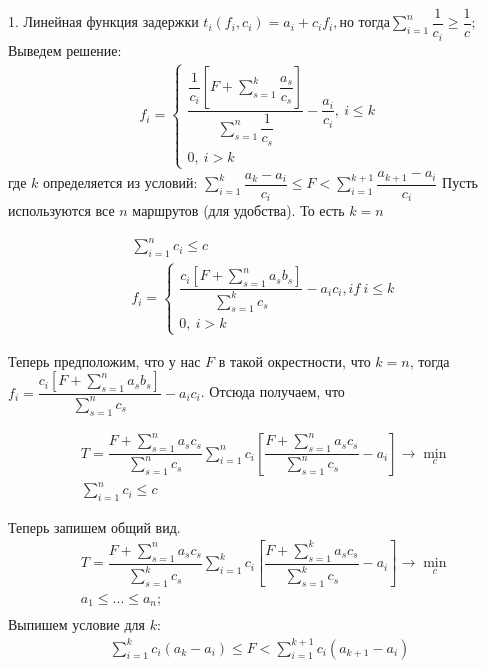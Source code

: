 \documentclass[12pt,a4paper,titlepage,oneside]{book}
\theoremstyle{definition}
\theoremstyle{plain}
\theoremstyle{remark}
\theoremstyle{remark}
\theoremstyle{plain}
\theoremstyle{plain}
\begin{document}
1. Линейная функция задержки $ t_i(f_i,c_i)=a_i+c_i f_i,\text {но тогда} \sum \limits_{i=1}^n \dfrac{1}{c_i} \geqslant \dfrac{1}{c}; $
Выведем решение:
\begin{align*}
f_i=
\begin{cases}
\dfrac{\dfrac{1}{c_i} \left [F+\sum \limits_{s=1}^k \dfrac{a_s}{c_s}\right ]}{\sum \limits_{s=1}^n  \dfrac{1}{c_s}}-\dfrac{a_i}{c_i}, \: i \leqslant k\\
0, \: i>k
\end{cases}
\end{align*}
где $k$ определяется из условий: $\sum \limits_{i=1}^k \dfrac{a_k-a_i}{c_i} \leqslant F < \sum \limits_{i=1}^{k+1} \dfrac{a_{k+1}-a_i}{c_i} $
Пусть используются все $n$ маршрутов (для удобства). То есть $k=n$

\begin{align*}
&\sum \limits_{i=1}^n c_i \leqslant c\\
&f_i=
\begin{cases}
\dfrac{c_i \left [F+\sum \limits_{s=1}^n a_s b_s \right ]}{\sum \limits_{s=1}^k c_s}-a_i c_i, if \: i \leqslant k\\
0, \: i>k
\end{cases}
\end{align*}


Теперь предположим, что у нас $ F $ в такой окрестности, что $ k = n $, тогда $ f_i=\dfrac{c_i \left [F+ \sum \limits_{s=1}^n a_s b_s\right ]}{\sum \limits_{s=1}^n c_s} -a_i c_i $. Отсюда получаем, что

\begin{align*}
&T=\dfrac{F+\sum \limits_{s=1}^n a_s c_s }{\sum \limits_{s=1}^n c_s} \sum \limits_{i=1}^n  c_i \left [ \dfrac{F+\sum \limits_{s=1}^n a_s c_s }{\sum \limits_{s=1}^n c_s} -a_i \right ] \rightarrow \min \limits_{c}\\
& \sum \limits_{i=1}^n c_i \leqslant c
\end{align*}

Теперь запишем общий вид.
\begin{align*}
&T=\dfrac{F+\sum \limits_{s=1}^n a_s c_s }{\sum \limits_{s=1}^k c_s} \sum \limits_{i=1}^k  c_i \left [ \dfrac{F+\sum \limits_{s=1}^k a_s c_s }{\sum \limits_{s=1}^k c_s} -a_i \right ] \rightarrow \min \limits_{c}\\
& a_1 \leqslant...\leqslant a_n; \\
\end{align*}
Выпишем условие для $k$: 
\begin{align*}
\sum \limits _{i=1}^k c_i(a_k-a_i) \leqslant F < \sum \limits_{i=1}^{k+1} c_i(a_{k+1}-a_i)
\end{align*}
\end{document}
